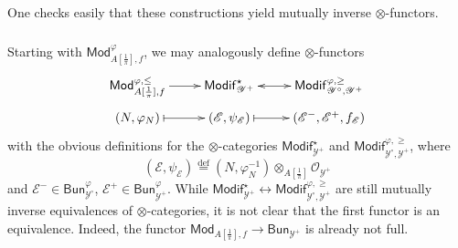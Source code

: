 \documentclass[11pt]{article}
\theoremstyle{definition}
\numberwithin{equation}{section}
\numberwithin{figure}{section}
\numberwithin{table}{section}
\newcommand{\Mod}{\mathsf{Mod}}
\newcommand{\Modif}{\mathsf{Modif}}
\newcommand{\Bun}{\mathsf{Bun}}
\newcommand{\eqd}{\stackrel{\mathrm{def}}{=}}
\begin{document}
One checks easily that these constructions yield mutually inverse $\otimes$-functors.

\subsubsection{}\label{subsec:VariantA=00005B1/pi=00005D}

Starting with $\Mod_{A[\frac{1}{\pi}],f}^{\varphi}$, we may analogously define $\otimes$-functors
\[
\xymatrix@R=0.5pc{\Mod_{A[\frac{1}{\pi}],f}^{\varphi,\leq}\ar[r] & \Modif_{\mathscr{Y}^{+}}^{\star}\ar@{<->}[r] & \Modif_{\mathscr{Y}^{\circ},\mathscr{Y}^{+}}^{\varphi,\geq}\\
(N,\varphi_{N})\ar@{|->}[r] & (\mathscr{E},\psi_{\mathscr{E}})\ar@{|->}[r] & (\mathscr{E}^{-},\mathscr{E}^{+},f_{\mathscr{E}}) }
\]
with the obvious definitions for the $\otimes$-categories $\Modif_{\mathscr{Y}^{+}}^{\star}$ and $\Modif_{\mathscr{Y}^{\circ},\mathscr{Y}^{+}}^{\varphi,\geq}$, where
\[
(\mathscr{E},\psi_{\mathscr{E}})\eqd(N,\varphi_{N}^{-1})\otimes_{A[\frac{1}{\pi}]}\mathscr{O}_{\mathscr{Y}^{+}}
\]
and $\mathscr{E}^{-}\in\Bun_{\mathscr{Y}^{\circ}}^{\varphi}$, $\mathscr{E}^{+}\in\Bun_{\mathscr{Y}^{+}}^{\varphi}$. While $\Modif_{\mathscr{Y}^{+}}^{\star}\leftrightarrow\Modif_{\mathscr{Y}^{\circ},\mathscr{Y}^{+}}^{\varphi,\geq}$ are still mutually inverse equivalences of $\otimes$-categories, it is not clear that the first functor is an equivalence. Indeed, the functor $\Mod_{A[\frac{1}{\pi}],f}\rightarrow\Bun_{\mathscr{Y}^{+}}$ is already not full.

\subsubsection{}\label{subsec:PhiBunOverY-}
\end{document}
